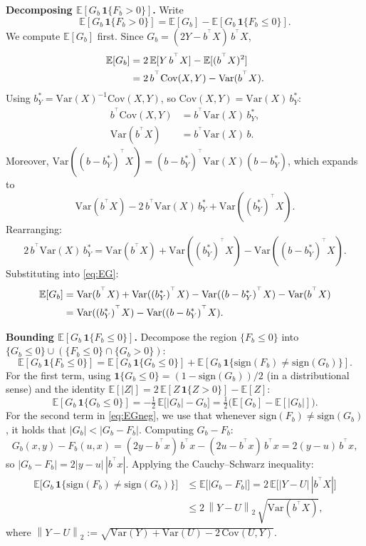 \documentclass[11pt]{article}
\theoremstyle{definition}
\theoremstyle{remark}
\newcommand{\E}{\mathbb{E}}
\newcommand{\norm}[1]{\left\lVert#1\right\rVert}
\newcommand{\T}{^{\top}}
\begin{document}
\textbf{Decomposing $\E[G_{b}\,\mathbf{1}\{F_{b}>0\}]$.}
Write
\[
  \E[G_{b}\,\mathbf{1}\{F_{b}>0\}]
  = \E[G_{b}] - \E[G_{b}\,\mathbf{1}\{F_{b}\le 0\}].
\]
We compute $\E[G_{b}]$ first.  Since $G_{b} = (2Y-b^{\T}X)\,b^{\T}X$,
\begin{align}
  \E[G_{b}]
  &= 2\,\E[Y\,b^{\T}X] - \E[(b^{\T}X)^{2}] \notag\\
  &= 2\,b^{\T}\mathrm{Cov}(X,Y) - \mathrm{Var}(b^{\T}X). \label{eq:EG}
\end{align}
Using $b_{Y}^{*} = \mathrm{Var}(X)^{-1}\mathrm{Cov}(X,Y)$, so
$\mathrm{Cov}(X,Y) = \mathrm{Var}(X)\,b_{Y}^{*}$:
\begin{align*}
  b^{\T}\mathrm{Cov}(X,Y)
  &= b^{\T}\mathrm{Var}(X)\,b_{Y}^{*},\\
  \mathrm{Var}(b^{\T}X)
  &= b^{\T}\mathrm{Var}(X)\,b.
\end{align*}
Moreover, $\mathrm{Var}((b-b_{Y}^{*})^{\T}X) = (b-b_{Y}^{*})^{\T}\mathrm{Var}(X)(b-b_{Y}^{*})$,
which expands to
\[
  \mathrm{Var}(b^{\T}X) - 2\,b^{\T}\mathrm{Var}(X)\,b_{Y}^{*}
  + \mathrm{Var}((b_{Y}^{*})^{\T}X).
\]
Rearranging:
\[
  2\,b^{\T}\mathrm{Var}(X)\,b_{Y}^{*}
  = \mathrm{Var}(b^{\T}X)
    + \mathrm{Var}((b_{Y}^{*})^{\T}X)
    - \mathrm{Var}((b-b_{Y}^{*})^{\T}X).
\]
Substituting into \eqref{eq:EG}:
\begin{align}
  \E[G_{b}]
  &= \mathrm{Var}(b^{\T}X)
     + \mathrm{Var}((b_{Y}^{*})^{\T}X)
     - \mathrm{Var}((b-b_{Y}^{*})^{\T}X)
     - \mathrm{Var}(b^{\T}X) \notag\\
  &= \mathrm{Var}((b_{Y}^{*})^{\T}X)
     - \mathrm{Var}((b-b_{Y}^{*})^{\T}X). \label{eq:EGsimple}
\end{align}

\textbf{Bounding $\E[G_{b}\,\mathbf{1}\{F_{b}\le 0\}]$.}
Decompose the region $\{F_{b}\le 0\}$ into
$\{G_{b}\le 0\}\cup(\{F_{b}\le 0\}\cap\{G_{b}>0\})$:
\begin{equation}\label{eq:EGneg}
  \E[G_{b}\,\mathbf{1}\{F_{b}\le 0\}]
  = \E[G_{b}\,\mathbf{1}\{G_{b}\le 0\}]
    + \E[G_{b}\,\mathbf{1}\{\mathrm{sign}(F_{b})\ne\mathrm{sign}(G_{b})\}].
\end{equation}
For the first term, using $\mathbf{1}\{G_{b}\le 0\} = (1-\mathrm{sign}(G_{b}))/2$ (in a
distributional sense) and the identity $\E[|Z|] = 2\,\E[Z\,\mathbf{1}\{Z>0\}]-\E[Z]$:
\[
  \E[G_{b}\,\mathbf{1}\{G_{b}\le 0\}]
  = -\tfrac{1}{2}\,\E\!\bigl[|G_{b}| - G_{b}\bigr]
  = \tfrac{1}{2}\bigl(\E[G_{b}] - \E[|G_{b}|]\bigr).
\]
For the second term in \eqref{eq:EGneg}, we use that whenever
$\mathrm{sign}(F_{b})\ne\mathrm{sign}(G_{b})$, it holds that $|G_{b}|<|G_{b}-F_{b}|$.
Computing $G_{b}-F_{b}$:
\[
  G_{b}(x,y) - F_{b}(u,x)
  = (2y-b^{\T}x)\,b^{\T}x - (2u-b^{\T}x)\,b^{\T}x
  = 2(y-u)\,b^{\T}x,
\]
so $|G_{b}-F_{b}| = 2|y-u|\,|b^{\T}x|$.  Applying the Cauchy--Schwarz inequality:
\begin{align*}
  \E\!\bigl[G_{b}\,\mathbf{1}\{\mathrm{sign}(F_{b})\ne\mathrm{sign}(G_{b})\}\bigr]
  &\le \E\!\bigl[|G_{b}-F_{b}|\bigr]
   = 2\,\E\!\bigl[|Y-U|\,|b^{\T}X|\bigr]\\
  &\le 2\,\norm{Y-U}_{2}\,\sqrt{\mathrm{Var}(b^{\T}X)},
\end{align*}
where $\norm{Y-U}_{2} := \sqrt{\mathrm{Var}(Y)+\mathrm{Var}(U)-2\,\mathrm{Cov}(U,Y)}$.
\end{document}
